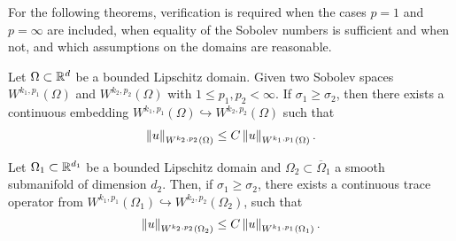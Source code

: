 \begin{todo}
  For the following theorems, verification is required when the cases $p=1$ and
  $p=\infty$ are included, when equality of the Sobolev numbers is
  sufficient and when not, and which assumptions on the domains are reasonable.
\end{todo}

\begin{theorem}
  Let $\Omega \subset \mathbb R^d$ be a bounded Lipschitz domain. Given two
  Sobolev spaces $W^{k_1, p_1}(\Omega)$ and $W^{k_2, p_2}(\Omega)$
  with $1 \le p_1, p_2 < \infty$. If $\sigma_1 \ge \sigma_2$, then
  there exists a continuous embedding $W^{k_1,
    p_1}(\Omega)\hookrightarrow W^{k_2, p_2}(\Omega)$ such that
\begin{gather*}
  \left\|u\right\|_{W^{k_2, p_2}(\Omega)} \le C \left\|u\right\|_{W^{k_1, p_1}(\Omega)}.
\end{gather*}
\end{theorem}

\begin{theorem}
  Let $\Omega_1 \subset \mathbb R^{d_1}$ be a bounded Lipschitz domain and
  $\Omega_2\subset \overline\Omega_1$ a smooth submanifold of
  dimension $d_2$. Then, if $\sigma_1 \ge \sigma_2$, there exists a
  continuous trace operator from $W^{k_1,
    p_1}(\Omega_1)\hookrightarrow W^{k_2, p_2}(\Omega_2)$, such that
  \begin{gather*}
    \left\|u\right\|_{W^{k_2, p_2}(\Omega_2)} \le C \left\|u\right\|_{W^{k_1, p_1}(\Omega_1)}.
  \end{gather*}
\end{theorem}



